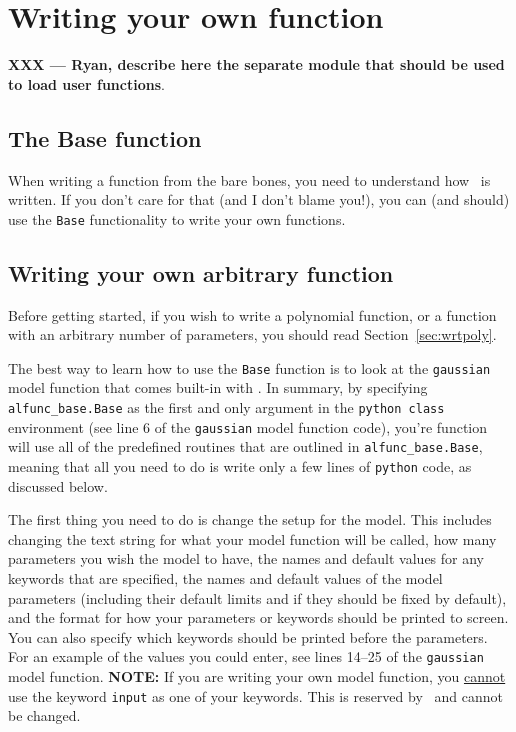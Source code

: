 \section{Writing your own function}
\label{sec:newfunctions}

\textbf{XXX --- Ryan, describe here the separate module that should be
used to load user functions}.

\subsection{The Base function}

When writing a function from the bare bones, you need to understand
how \alis\ is written. If you don't care for that (and I don't blame you!),
you can (and should) use the \texttt{Base} functionality to write your
own functions.

\subsection{Writing your own arbitrary function}

Before getting started, if you wish to write a polynomial function,
or a function with an arbitrary number of parameters, you should
read Section~\ref{sec:wrtpoly}.

The best way to learn how to use the \texttt{Base} function is to look at
the \texttt{gaussian} model function that comes built-in with \alis. In
summary, by specifying \texttt{alfunc\_base.Base} as the first and only
argument in the \texttt{python class} environment (see line 6 of the
\texttt{gaussian} model function code), you're function will use all of
the predefined routines that are outlined in \texttt{alfunc\_base.Base},
meaning that all you need to do is write only a few lines of \texttt{python}
code, as discussed below.

The first thing you need to do is change the setup for the model. This
includes changing the text string for what your model function will be
called, how many parameters you wish the model to have, the names and
default values for any keywords that are specified, the names and default
values of the model parameters (including their default limits and if they
should be fixed by default), and the format for how your parameters or
keywords should be printed to screen. You can also specify which keywords
should be printed before the parameters. For an example of the values
you could enter, see lines 14--25 of the \texttt{gaussian} model function.
\textbf{NOTE:} If you are writing your own model function, you
\underline{cannot} use the keyword \texttt{input} as one of your keywords.
This is reserved by \alis\ and cannot be changed.

